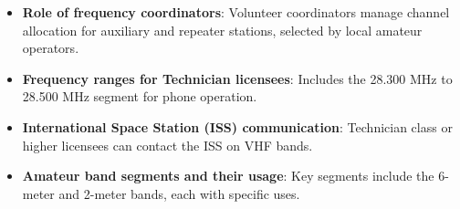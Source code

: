 \begin{itemize}
    \item \textbf{Role of frequency coordinators}: Volunteer coordinators manage channel allocation for auxiliary and repeater stations, selected by local amateur operators.
    \item \textbf{Frequency ranges for Technician licensees}: Includes the 28.300 MHz to 28.500 MHz segment for phone operation.
    \item \textbf{International Space Station (ISS) communication}: Technician class or higher licensees can contact the ISS on VHF bands.
    \item \textbf{Amateur band segments and their usage}: Key segments include the 6-meter and 2-meter bands, each with specific uses.
\end{itemize}
